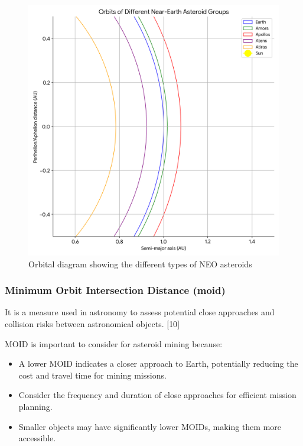 \documentclass[
]{article}
\begin{document}
\begin{figure}
\centering
\includegraphics{./images/neo_orbital_paths.png}
\caption{Orbital diagram showing the different types of NEO asteroids}
\end{figure}

\hypertarget{minimum-orbit-intersection-distance-moid}{%
\subsubsection{Minimum Orbit Intersection Distance
(moid)}\label{minimum-orbit-intersection-distance-moid}}

It is a measure used in astronomy to assess potential close approaches
and collision risks between astronomical objects. {[}10{]}

MOID is important to consider for asteroid mining because:

\begin{itemize}
\item
  A lower MOID indicates a closer approach to Earth, potentially
  reducing the cost and travel time for mining missions.
\item
  Consider the frequency and duration of close approaches for efficient
  mission planning.
\item
  Smaller objects may have significantly lower MOIDs, making them more
  accessible.
\end{itemize}
\end{document}
